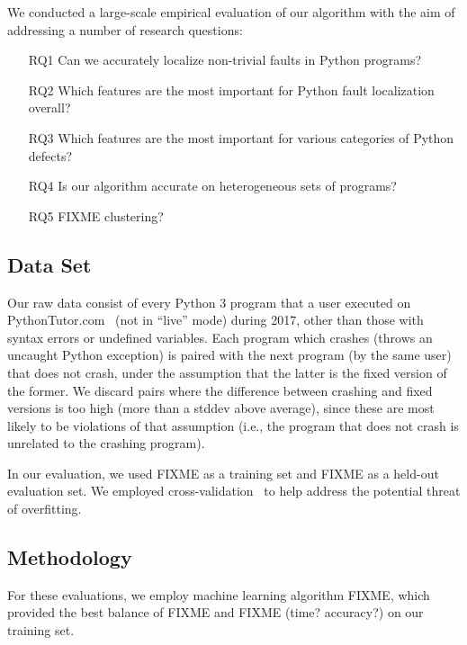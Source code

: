 \documentclass[conference]{IEEEtran}
\begin{document}
We conducted a large-scale empirical evaluation of our algorithm with the
aim of addressing a number of research questions:
\begin{enumerate}

\item[RQ1]{Can we accurately localize non-trivial faults in Python
programs?}

\item[RQ2]{Which features are the most important for Python fault
localization overall?}

\item[RQ3]{Which features are the most important for various categories of
Python defects?}

\item[RQ4]{Is our algorithm accurate on heterogeneous sets of programs?}

\item[RQ5]{FIXME clustering?}

\end{enumerate}

\subsection{Data Set}

Our raw data consist of every Python 3 program that a user executed on
PythonTutor.com~\cite{Guo2013-vu} (not in ``live'' mode) during 2017, other
than those with syntax errors or undefined variables.  Each program which
crashes (throws an uncaught Python exception) is paired with the next
program (by the same user) that does not crash, under the assumption that
the latter is the fixed version of the former. We discard pairs where the
difference between crashing and fixed versions is too high (more than a
stddev above average), since these are most likely to be violations of that
assumption (i.e., the program that does not crash is unrelated to the
crashing program).

In our evaluation, we used FIXME as a training set and FIXME as a held-out
evaluation set. We employed cross-validation~\cite{kohavi} to help address
the potential threat of overfitting.

\subsection{Methodology}

For these evaluations, we employ machine learning algorithm FIXME, which
provided the best balance of FIXME and FIXME (time? accuracy?) on our
training set.
\end{document}
